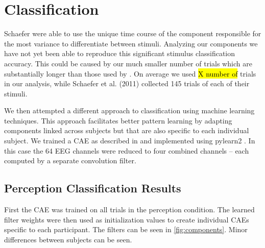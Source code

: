 \section*{Classification}
Schaefer \etal \cite{schaefer_name_2011} were able to use the unique time course of the component responsible for the most variance to differentiate between stimuli.
Analyzing our components we have not yet been able to reproduce this significant stimulus classification accuracy. 
This could be caused by our much smaller number of trials which are substantially longer than those used by \cite{schaefer_name_2011}. 
On average we used \hl{X number of} trials in our analysis, while Schaefer et al. (2011) collected 145 trials of each of their stimuli.

We then attempted a different approach to classification using machine learning techniques. This approach facilitates better pattern learning by adapting components linked across subjects but that are also specific to each individual subject. 
We trained a \ac{CAE} as described in \cite{masci_stacked_2011} and implemented using pylearn2 \cite{goodfellow_pylearn2_2013}.
In this case the 64 \ac{EEG} channels were reduced to four combined channels -- each computed by a separate convolution filter. 
\subsection*{Perception Classification Results}
First the \ac{CAE} was trained on all trials in the perception condition. The learned filter weights were then used as initialization values to create individual \ac{CAE}s specific to each participant.
The filters can be seen in \autoref{fig:components}. 
Minor differences between subjects can be seen. 

